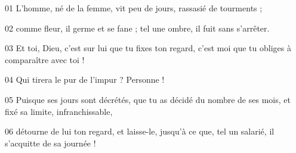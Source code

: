 01 L’homme, né de la femme, vit peu de jours, rassasié de tourments ;

02 comme fleur, il germe et se fane ; tel une ombre, il fuit sans s’arrêter.

03 Et toi, Dieu, c’est sur lui que tu fixes ton regard, c’est moi que tu obliges à comparaître avec toi !

04 Qui tirera le pur de l’impur ? Personne !

05 Puisque ses jours sont décrétés, que tu as décidé du nombre de ses mois, et fixé sa limite, infranchissable,

06 détourne de lui ton regard, et laisse-le, jusqu’à ce que, tel un salarié, il s’acquitte de sa journée !